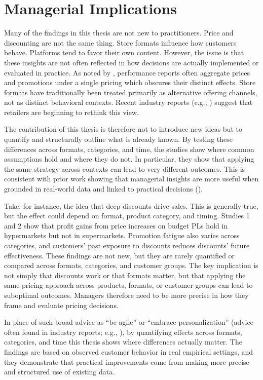 \section{Managerial Implications}

Many of the findings in this thesis are not new to practitioners. Price and discounting are not the same thing. Store formats influence how customers behave. Platforms tend to favor their own content. However, the issue is that these insights are not often reflected in how decisions are actually implemented or evaluated in practice. As noted by \textcite{McKinsey-Company2021-wc}, performance reports often aggregate prices and promotions under a single pricing which obscures their distinct effects. Store formats have traditionally been treated primarily as alternative offering channels, not as distinct behavioral contexts. Recent industry reports (e.g., \cite{Accenture2024-vg,Bain-Company2025-hz}) suggest that retailers are beginning to rethink this view.

The contribution of this thesis is therefore not to introduce new ideas but to quantify and structurally outline what is already known. By testing these differences across formats, categories, and time, the studies show where common assumptions hold and where they do not. In particular, they show that applying the same strategy across contexts can lead to very different outcomes. This is consistent with prior work showing that managerial insights are more useful when grounded in real-world data and linked to practical decisions (\cite{Schauerte2023-dn}).

Take, for instance, the idea that deep discounts drive sales. This is generally true, but the effect could depend on format, product category, and timing. Studies 1 and 2 show that profit gains from price increases on budget PLs hold in hypermarkets but not in supermarkets. Promotion fatigue also varies across categories, and customers’ past exposure to discounts reduces discounts’ future effectiveness. These findings are not new, but they are rarely quantified or compared across formats, categories, and customer groups. The key implication is not simply that discounts work or that formats matter, but that applying the same pricing approach across products, formats, or customer groups can lead to suboptimal outcomes. Managers therefore need to be more precise in how they frame and evaluate pricing decisions.

In place of such broad advice as “be agile” or “embrace personalization” (advice often found in industry reports; e.g., \cite{Accenture2024-vg,McKinsey-Company2019-cx}), by quantifying effects across formats, categories, and time this thesis shows where differences actually matter. The findings are based on observed customer behavior in real empirical settings, and they demonstrate that practical improvements come from making more precise and structured use of existing data.

